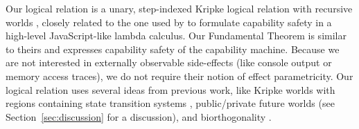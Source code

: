 \documentclass[format=acmsmall, review=false, screen=true]{acmart}
\renewcommand{\sectionname}{Section}
\newcommand\lau[1]{{\color{purple} \sf \footnotesize {LS: #1}}\\}
\renewcommand\lau[1]{}
\begin{document}
\lau{Reviewer C, esop, would like a better comparison with \citec{Devriese:2016ObjCap} (but also admits that they did not follow the below discussion).}
Our logical relation is a unary, step-indexed Kripke logical relation with
recursive worlds
\citep{pitts_operational_1998,Appel:2001:IMR:504709.504712,Ahmed2004semantics,Birkedal:2011:SKM:1926385.1926401},
closely related to the one used by \citet{Devriese:2016ObjCap} to formulate
capability safety in a high-level JavaScript-like lambda calculus. Our
Fundamental Theorem is similar to theirs and expresses capability safety of the
capability machine. Because we are not interested in externally observable
side-effects (like console output or memory access traces), we do not require
their notion of effect parametricity. Our logical relation uses several ideas
from previous work, like Kripke worlds with regions containing state transition
systems \citep{Ahmed:popl09}, public/private future worlds \citep{Dreyer:jfp12}
(see \sectionname~\ref{sec:discussion} for a discussion), and biorthogonality
\citep{pitts_operational_1998,benton_biorthogonality_2009-1,Hur:2011:KLR:1926385.1926402}.
\end{document}
